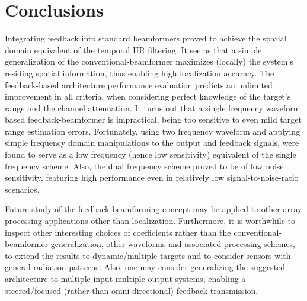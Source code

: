\section{Conclusions}
\label{sec_conclusions}
Integrating feedback into standard beamformers proved to achieve the spatial domain equivalent of the temporal IIR filtering.
It seems that a simple generalization of the conventional-beamformer maximizes (locally) the system's residing spatial information, thus enabling high localization accuracy.
The feedback-based architecture performance evaluation predicts an unlimited improvement in all criteria, when considering perfect knowledge of the target's range and the channel attenuation.
It turns out that a single frequency waveform based feedback-beamformer is impractical, being too sensitive to even mild target range estimation errors.
Fortunately, using two frequency waveform and applying simple frequency domain manipulations to the output and feedback signals, were found to serve as a low frequency (hence low sensitivity) equivalent of the single frequency scheme.
Also, the dual frequency scheme proved to be of low noise sensitivity, featuring high performance even in relatively low signal-to-noise-ratio scenarios.
\par Future study of the feedback beamforming concept may be applied to other array processing applications other than localization.
Furthermore, it is worthwhile to inspect other interesting choices of coefficients rather than the conventional-beamformer generalization, other waveforms and associated processing schemes, to extend the results to dynamic/multiple targets and to consider sensors with general radiation patterns.
Also, one may consider generalizing the suggested architecture to multiple-input-multiple-output systems, enabling a steered/focused (rather than omni-directional) feedback transmission.